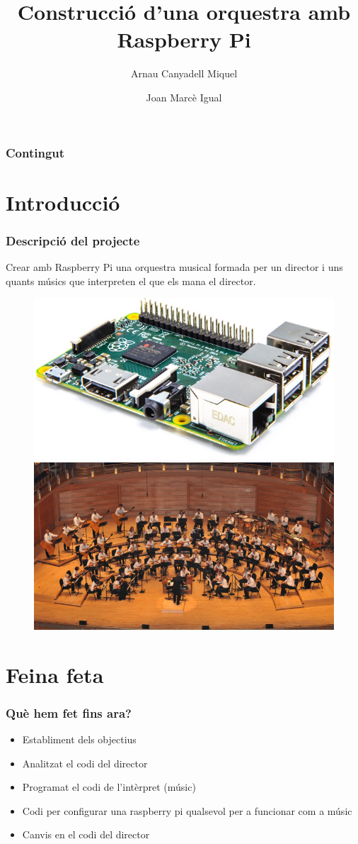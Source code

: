 \documentclass{beamer}
\title{Construcció d'una orquestra amb Raspberry Pi}
\author{Arnau Canyadell Miquel \and Joan Marcè Igual}
\begin{document}
\frame{\titlepage}

\begin{frame}
	\frametitle{Contingut}
	\tableofcontents
\end{frame}

\section{Introducció}

\begin{frame}
	\frametitle{Descripció del projecte}
	Crear amb Raspberry Pi una orquestra musical formada per un director i uns quants músics que interpreten el que els mana el director.
	\begin{figure}
		\includegraphics[width=0.475\linewidth]{images/raspberry}
		\hfill
		\includegraphics[width=0.475\linewidth]{images/orchestra}
	\end{figure}
\end{frame}

\section{Feina feta}
\begin{frame}
	\frametitle{Què hem fet fins ara?}
	\begin{itemize}
		\item Establiment dels objectius
		\item Analitzat el codi del director
		\item Programat el codi de l'intèrpret (músic)
		\item Codi per configurar una raspberry pi qualsevol per a funcionar com a músic
		\item Canvis en el codi del director
	\end{itemize}
\end{frame}
\end{document}
